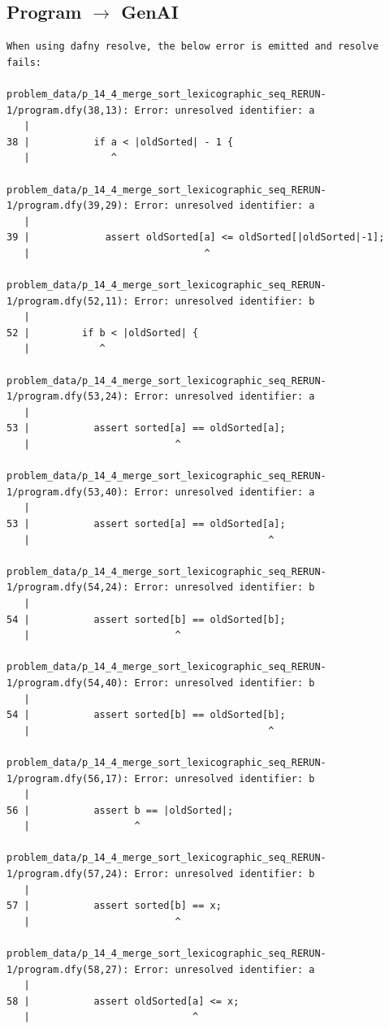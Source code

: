 \documentclass{article}
\begin{document}
\subsection*{Program $\rightarrow$ GenAI}
\begin{lstlisting}
When using dafny resolve, the below error is emitted and resolve fails:

problem_data/p_14_4_merge_sort_lexicographic_seq_RERUN-1/program.dfy(38,13): Error: unresolved identifier: a
   |
38 |           if a < |oldSorted| - 1 {
   |              ^

problem_data/p_14_4_merge_sort_lexicographic_seq_RERUN-1/program.dfy(39,29): Error: unresolved identifier: a
   |
39 |             assert oldSorted[a] <= oldSorted[|oldSorted|-1];
   |                              ^

problem_data/p_14_4_merge_sort_lexicographic_seq_RERUN-1/program.dfy(52,11): Error: unresolved identifier: b
   |
52 |         if b < |oldSorted| {
   |            ^

problem_data/p_14_4_merge_sort_lexicographic_seq_RERUN-1/program.dfy(53,24): Error: unresolved identifier: a
   |
53 |           assert sorted[a] == oldSorted[a];
   |                         ^

problem_data/p_14_4_merge_sort_lexicographic_seq_RERUN-1/program.dfy(53,40): Error: unresolved identifier: a
   |
53 |           assert sorted[a] == oldSorted[a];
   |                                         ^

problem_data/p_14_4_merge_sort_lexicographic_seq_RERUN-1/program.dfy(54,24): Error: unresolved identifier: b
   |
54 |           assert sorted[b] == oldSorted[b];
   |                         ^

problem_data/p_14_4_merge_sort_lexicographic_seq_RERUN-1/program.dfy(54,40): Error: unresolved identifier: b
   |
54 |           assert sorted[b] == oldSorted[b];
   |                                         ^

problem_data/p_14_4_merge_sort_lexicographic_seq_RERUN-1/program.dfy(56,17): Error: unresolved identifier: b
   |
56 |           assert b == |oldSorted|;
   |                  ^

problem_data/p_14_4_merge_sort_lexicographic_seq_RERUN-1/program.dfy(57,24): Error: unresolved identifier: b
   |
57 |           assert sorted[b] == x;
   |                         ^

problem_data/p_14_4_merge_sort_lexicographic_seq_RERUN-1/program.dfy(58,27): Error: unresolved identifier: a
   |
58 |           assert oldSorted[a] <= x;
   |                            ^


\end{lstlisting}
\end{document}
